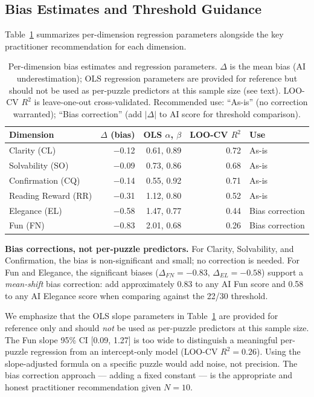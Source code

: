 \subsection{Bias Estimates and Threshold Guidance}
\label{sec:threshold}

Table~\ref{tab:scaling} summarizes per-dimension regression parameters alongside the key practitioner recommendation for each dimension.

\begin{table}[htbp]
\centering
\caption{Per-dimension bias estimates and regression parameters. $\Delta$ is the mean bias (AI underestimation); OLS regression parameters are provided for reference but should not be used as per-puzzle predictors at this sample size (see text). LOO-CV $R^2$ is leave-one-out cross-validated. Recommended use: ``As-is'' (no correction warranted); ``Bias correction'' (add $|\Delta|$ to AI score for threshold comparison).}
\label{tab:scaling}
\begin{tabular}{@{}lrrrl@{}}
\toprule
\textbf{Dimension} & \textbf{$\Delta$ (bias)} & \textbf{OLS $\alpha$, $\beta$} & \textbf{LOO-CV $R^2$} & \textbf{Use} \\
\midrule
Clarity (CL)        & $-$0.12 & 0.61, 0.89 & 0.72 & As-is        \\
Solvability (SO)    & $-$0.09 & 0.73, 0.86 & 0.68 & As-is        \\
Confirmation (CQ)   & $-$0.14 & 0.55, 0.92 & 0.71 & As-is        \\
Reading Reward (RR) & $-$0.31 & 1.12, 0.80 & 0.52 & As-is        \\
Elegance (EL)       & $-$0.58 & 1.47, 0.77 & 0.44 & Bias correction \\
Fun (FN)            & $-$0.83 & 2.01, 0.68 & 0.26 & Bias correction \\
\bottomrule
\end{tabular}
\end{table}

\textbf{Bias corrections, not per-puzzle predictors.} For Clarity, Solvability, and Confirmation, the bias is non-significant and small; no correction is needed. For Fun and Elegance, the significant biases ($\Delta_{FN} = -0.83$, $\Delta_{EL} = -0.58$) support a \emph{mean-shift} bias correction: add approximately 0.83 to any AI Fun score and 0.58 to any AI Elegance score when comparing against the 22/30 threshold.

We emphasize that the OLS slope parameters in Table~\ref{tab:scaling} are provided for reference only and should \emph{not} be used as per-puzzle predictors at this sample size. The Fun slope 95\% CI [0.09, 1.27] is too wide to distinguish a meaningful per-puzzle regression from an intercept-only model (LOO-CV $R^2 = 0.26$). Using the slope-adjusted formula on a specific puzzle would add noise, not precision. The bias correction approach --- adding a fixed constant --- is the appropriate and honest practitioner recommendation given $N=10$.

